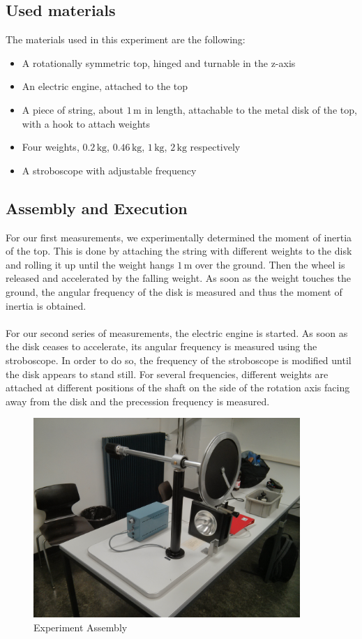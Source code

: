 \documentclass{scrreprt}
\newcommand{\unit}[1]{\ensuremath{\, \mathrm{#1}}}
\begin{document}
\subsection{Used materials}
The materials used in this experiment are the following:
\begin{itemize}
\item A rotationally symmetric top, hinged and turnable in the z-axis
\item An electric engine, attached to the top
\item A piece of string, about $1 \unit{m}$ in length, attachable to the metal disk of the top, with a hook to attach weights
\item Four weights, $0.2 \unit{kg}$, $0.46 \unit{kg}$, $1 \unit{kg}$, $2 \unit{kg}$ respectively
\item A stroboscope with adjustable frequency
\end{itemize}

\subsection{Assembly and Execution}
For our first measurements, we experimentally determined the moment of inertia of the top. This is done by attaching the string with different weights to the disk and rolling it up until the weight hangs $1 \unit{m}$ over the ground. Then the wheel is released and accelerated by the falling weight. As soon as the weight touches the ground, the angular frequency of the disk is measured and thus the moment of inertia is obtained.\\\\
For our second series of measurements, the electric engine is started. As soon as the disk ceases to accelerate, its angular frequency is measured using the stroboscope. In order to do so, the frequency of the stroboscope is modified until the disk appears to stand still. For several frequencies, different weights are attached at different positions of the shaft on the side of the rotation axis facing away from the disk and the precession frequency is measured.

\begin{figure}[H]
	\centering
  \includegraphics[width=0.9\textwidth]{img/assembly.jpg}
	\caption{Experiment Assembly}
	\label{fig:assembly}
\end{figure}
\end{document}
